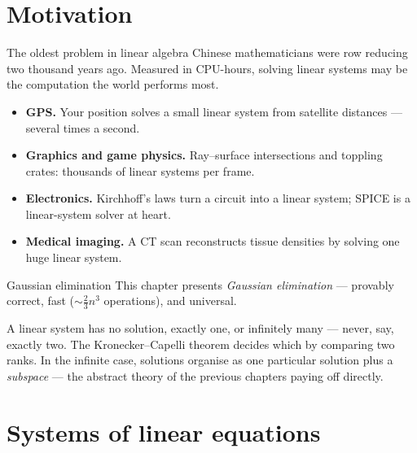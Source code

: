 

\section{Motivation}

\begin{frame}{The oldest problem in linear algebra}
Chinese mathematicians were row reducing two thousand years ago. Measured in CPU-hours, solving linear
systems may be the computation the world performs most.

\pause

\begin{itemize}
\item \textbf{GPS.} Your position solves a small linear system from satellite distances — several times a second.
\pause
\item \textbf{Graphics and game physics.} Ray–surface intersections and toppling crates: thousands of
linear systems per frame.
\pause
\item \textbf{Electronics.} Kirchhoff's laws turn a circuit into a linear system; SPICE is a linear-system
solver at heart.
\pause
\item \textbf{Medical imaging.} A CT scan reconstructs tissue densities by solving one huge linear system.
\end{itemize}
\end{frame}

\begin{frame}{Gaussian elimination}
This chapter presents \emph{Gaussian elimination} — provably correct, fast ($\sim\tfrac23 n^3$ operations),
and universal.

\pause

\begin{remark}
A linear system has no solution, exactly one, or infinitely many — never, say, exactly two. The
Kronecker--Capelli theorem decides which by comparing two ranks. In the infinite case, solutions organise
as one particular solution plus a \emph{subspace} — the abstract theory of the previous chapters paying
off directly.
\end{remark}
\end{frame}

\section{Systems of linear equations}

